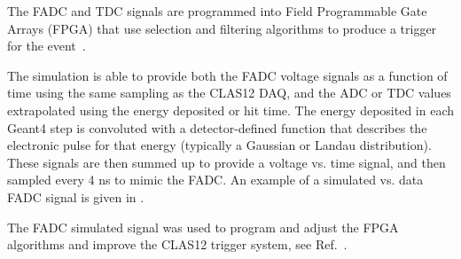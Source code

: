 The FADC and TDC signals are programmed into Field Programmable Gate Arrays (FPGA) that use selection and filtering
algorithms to produce a trigger for the event~\cite{trigger-nim}.

The simulation is able to provide both the FADC voltage signals as a function of time using the same sampling as the
CLAS12 DAQ, and the ADC or TDC values extrapolated using the energy deposited or hit time. The energy deposited
in each Geant4 step is convoluted with a detector-defined function that describes the electronic pulse for that energy
(typically a Gaussian or Landau distribution). These signals are then summed up to provide a voltage vs. time signal, and
then sampled every 4 ns to mimic the FADC. An example of a simulated vs. data FADC signal is given in .

The FADC simulated signal was used to program and adjust the FPGA algorithms and improve the CLAS12 trigger system,
see Ref.~\cite{trigger-nim}.

